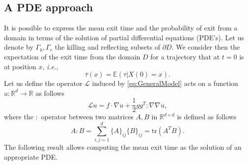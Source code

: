 \subsection{A PDE approach}\label{sec:PDEs}
It is possible to express the mean exit time and the probability of exit from a domain in terms of the solution of partial differential equations (PDE's).
Let us denote by $\Gamma_k,\Gamma_r$ the killing and reflecting subsets of $\partial D$. We consider then the expectation of the exit time from the domain $D$ for a trajectory that at $t=0$ is at position $x$, \textit{i.e.},
\begin{equation}\label{eq:ExpTau}
	\bar\tau(x) = \mathbb{E}(\tau | X(0) = x).
\end{equation}
Let us define the operator $\mathcal L$ induced by \eqref{eq:GeneralModel} acts on a function $u\colon \mathbb{R}^d \rightarrow \mathbb{R}$  as follows
\begin{equation}\label{eq:LOperator}
	\mathcal Lu = f \cdot \nabla u + \frac{1}{2} gg^T : \nabla \nabla u,
\end{equation}
where the $:$ operator between two matrices $A,B$ in $\mathbb{R}^{d\times d}$ is defined as follows
\begin{equation}\label{eq:twoPoints}
	A : B = \sum_{i,j = 1}^d \{A\}_{ij}\{B\}_{ij} = \text{tr}(A^TB).
\end{equation}
The following result allows computing the mean exit time as the solution of an appropriate PDE.

